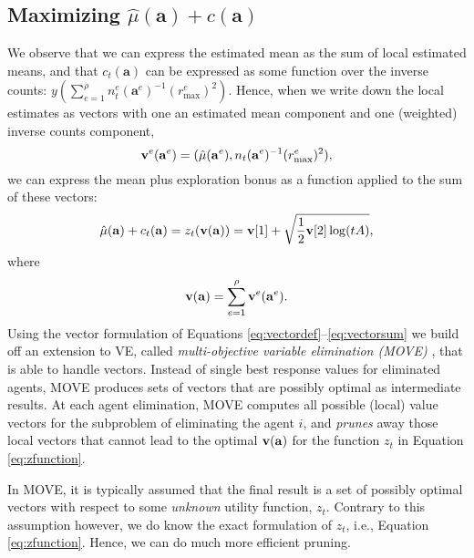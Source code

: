 \documentclass{article}
\newcommand{\est}{\hat{\mu}}
\begin{document}
\subsection{Maximizing $\est(\mathbf{a}) + c(\mathbf{a})$}\label{sec:ucve}
 We observe that we can express the estimated mean as the sum of local estimated means, and that $c_t(\mathbf{a})$ can be expressed as some function over the inverse counts: $y(\sum_{e=1}^\rho n^e_t(\mathbf{a}^e)^{-1} (r_{\max}^e)^2)$. Hence, when we write down the local estimates as vectors with one an estimated mean component and one (weighted) inverse counts component, 
\begin{equation}\label{eq:vectordef}
 {\bf v}^e({\bf a}^e) =   (\est(\mathbf{a}^e), n_t(\mathbf{a}^e)^{-1} (r_{\max}^e)^2), 
\end{equation}
we can express the mean plus exploration bonus as a function applied to the sum of these vectors:
\begin{equation}\label{eq:zfunction}
\est(\mathbf{a}) + c_t(\mathbf{a}) = z_t( {\bf v}({\bf a})) = {\bf v}[1] + \sqrt{ \frac{1}{2}  {\bf v}[2] \log ( t A )},
\end{equation}
where
\begin{equation}\label{eq:vectorsum}
{\bf v}({\bf a}) = \sum^\rho_{e=1}  {\bf v}^e({\bf a}^e) .
\end{equation}
Using the vector formulation of Equations \ref{eq:vectordef}--\ref{eq:vectorsum} we build off an extension to VE, called \emph{multi-objective variable elimination (MOVE)} \cite{Rollon06MOBE,roijers2015computing}, that is able to handle vectors. Instead of single best response values for eliminated agents, MOVE produces sets of vectors that are possibly optimal as intermediate results. At each agent elimination, MOVE computes all possible (local) value vectors for the subproblem of eliminating the agent $i$, and \emph{prunes} away those local vectors that cannot lead to the optimal ${\bf v}({\bf a})$ for the function $z_t$ in Equation \ref{eq:zfunction}.   

In MOVE, it is typically assumed that the final result is a set of possibly optimal vectors with respect to some \emph{unknown} utility function, $z_t$. Contrary to this assumption however, we do know the exact formulation of $z_t$, i.e., Equation \ref{eq:zfunction}. Hence, we can do much more efficient pruning. 
\end{document}
